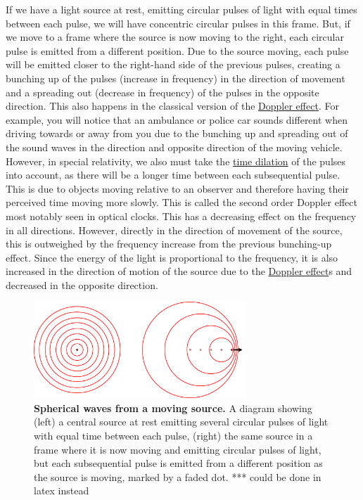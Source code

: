 If we have a light source at rest, emitting circular pulses of light with equal times between each pulse, we will have concentric circular pulses in this frame.
But, if we move to a frame where the source is now moving to the right, each circular pulse is emitted from a different position.
Due to the source moving, each pulse will be emitted closer to the right-hand side of the previous pulses, creating a bunching up of the pulses (increase in frequency) in the direction of movement and a spreading out (decrease in frequency) of the pulses in the opposite direction.
This also happens in the classical version of the \hyperlink{def-doppler-effect}{Doppler effect}.
For example, you will notice that an ambulance or police car sounds different when driving towards or away from you due to the bunching up and spreading out of the sound waves in the direction and opposite direction of the moving vehicle.
However, in special relativity, we also must take the \hyperlink{def-time-dilation}{time dilation} of the pulses into account, as there will be a longer time between each subsequential pulse.
This is due to objects moving relative to an observer and therefore having their perceived time moving more slowly.
This is called the second order Doppler effect most notably seen in optical clocks.
This has a decreasing effect on the frequency in all directions.
However, directly in the direction of movement of the source, this is outweighed by the frequency increase from the previous bunching-up effect.
Since the energy of the light is proportional to the frequency, it is also increased in the direction of motion of the source due to the \hyperlink{def-doppler-effect}{Doppler effect}s and decreased in the opposite direction.

\begin{figure}[H]
	\centering
	\includegraphics[width = 8cm]{images/pdf/Doppler.pdf}
	\caption{\textbf{Spherical waves from a moving source.} A diagram showing (left) a central source at rest emitting several circular pulses of light with equal time between each pulse, (right) the same source in a frame where it is now moving and emitting circular pulses of light, but each subsequential pulse is emitted from a different position as the source is moving, marked by a faded dot. *** could be done in latex instead}
	\label{fig: doppler effect intro}
\end{figure}

